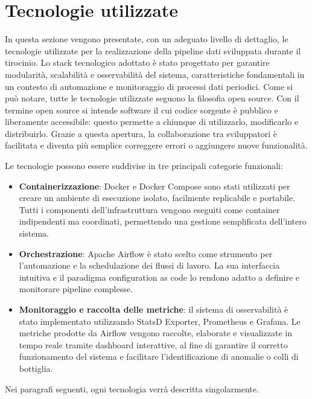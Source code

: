\chapter{Tecnologie utilizzate}
\label{cha:tecnologieutilizzate}
In questa sezione vengono presentate, con un adeguato livello di dettaglio, le tecnologie utilizzate per la realizzazione della pipeline dati sviluppata durante il tirocinio. Lo stack tecnologico adottato è stato progettato per garantire modularità, scalabilità e osservabilità del sistema, caratteristiche fondamentali in un contesto di automazione e monitoraggio di processi dati periodici. Come si può notare, tutte le tecnologie utilizzate seguono la filosofia open source. Con il termine open source si intende software il cui codice sorgente è pubblico e liberamente accessibile: questo permette a chiunque di utilizzarlo, modificarlo e distribuirlo. Grazie a questa apertura, la collaborazione tra sviluppatori è facilitata e diventa più semplice correggere errori o aggiungere nuove funzionalità.


Le tecnologie possono essere suddivise in tre principali categorie funzionali:

\begin{itemize}
    \item \textbf{Containerizzazione}: Docker e Docker Compose sono stati utilizzati per creare un ambiente di esecuzione isolato, facilmente replicabile e portabile. Tutti i componenti dell'infrastruttura vengono eseguiti come container indipendenti ma coordinati, permettendo una gestione semplificata dell'intero sistema.
    \item \textbf{Orchestrazione}: Apache Airflow è stato scelto come strumento per l'automazione e la schedulazione dei flussi di lavoro. La sua interfaccia intuitiva e il paradigma configuration as code lo rendono adatto a definire e monitorare pipeline complesse.
    \item \textbf{Monitoraggio e raccolta delle metriche}: il sistema di osservabilità è stato implementato utilizzando StatsD Exporter, Prometheus e Grafana. Le metriche prodotte da Airflow vengono raccolte, elaborate e visualizzate in tempo reale tramite dashboard interattive, al fine di garantire il corretto funzionamento del sistema e facilitare l'identificazione di anomalie o colli di bottiglia.
\end{itemize}

Nei paragrafi seguenti, ogni tecnologia verrà descritta singolarmente.



